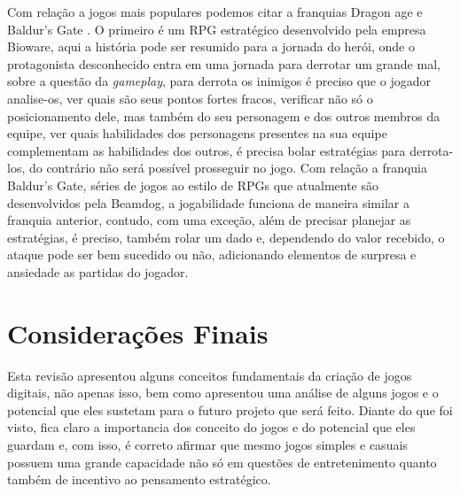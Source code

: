 \documentclass[12pt]{article}
\begin{document}
Com relação a jogos mais populares podemos citar a franquias Dragon age\cite{dragonage} e Baldur’s Gate \cite{baldur}. O primeiro é um RPG estratégico desenvolvido pela empresa Bioware, aqui a história pode ser resumido para a jornada do herói, onde o protagonista desconhecido entra em uma jornada para derrotar um grande mal, sobre a questão da \emph{gameplay}, para derrota os inimigos é preciso que o jogador analise-os, ver quais são seus pontos fortes fracos, verificar não só o posicionamento dele, mas também do seu personagem e dos outros membros da equipe, ver quais habilidades dos personagens presentes na sua equipe complementam as habilidades dos outros, é precisa bolar estratégias para derrota-los, do contrário não será possível prosseguir no jogo. Com relação a franquia Baldur’s Gate, séries de jogos ao estilo de RPGs que atualmente são desenvolvidos pela  Beamdog, a jogabilidade funciona de maneira similar a franquia anterior, contudo, com uma exceção, além de precisar planejar as estratégias, é preciso, também rolar um dado e, dependendo do valor recebido, o ataque pode ser bem sucedido ou não, adicionando elementos de surpresa e ansiedade as partidas do jogador.

\section{Considerações Finais}
Esta revisão apresentou alguns conceitos fundamentais da criação de jogos digitais, não apenas isso, bem como apresentou uma análise de alguns jogos e o potencial que eles sustetam para o futuro projeto que será feito. Diante do que foi visto, fica claro a importancia dos conceito do jogos e do potencial que eles guardam e, com isso, é correto afirmar que mesmo jogos simples e casuais possuem uma grande capacidade não só em questões de entretenimento quanto também de incentivo ao pensamento estratégico.



\end{document}
